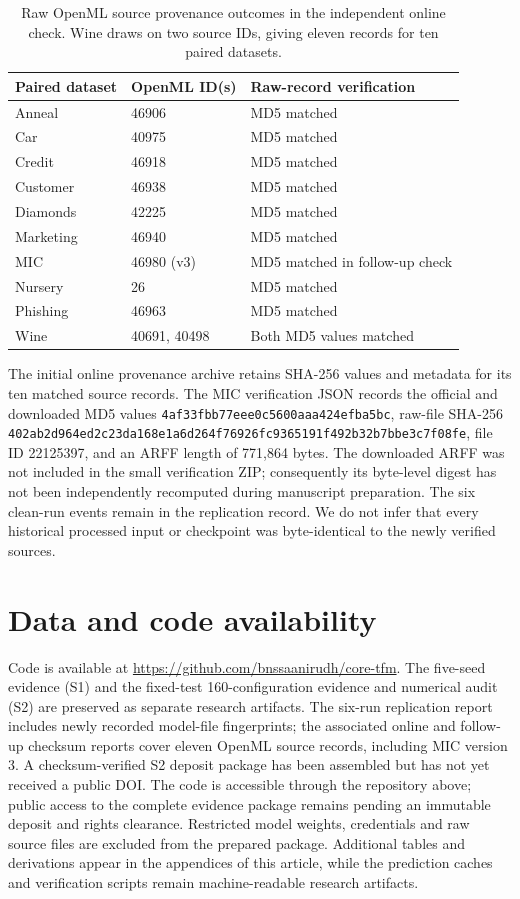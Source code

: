 \documentclass[a4paper,fleqn]{cas-sc}
\begin{document}
\begin{table}[htbp]
\centering
\caption{Raw OpenML source provenance outcomes in the independent online check. Wine draws on two source IDs, giving eleven records for ten paired datasets.}
\label{tab:openmlprovenance}
\begin{tabular}{lll}
\toprule
Paired dataset & OpenML ID(s) & Raw-record verification\\
\midrule
Anneal & 46906 & MD5 matched\\
Car & 40975 & MD5 matched\\
Credit & 46918 & MD5 matched\\
Customer & 46938 & MD5 matched\\
Diamonds & 42225 & MD5 matched\\
Marketing & 46940 & MD5 matched\\
MIC & 46980 (v3) & MD5 matched in follow-up check\\
Nursery & 26 & MD5 matched\\
Phishing & 46963 & MD5 matched\\
Wine & 40691, 40498 & Both MD5 values matched\\
\bottomrule
\end{tabular}
\end{table}
The initial online provenance archive retains SHA-256 values and metadata for its ten matched source records. The MIC verification JSON records the official and downloaded MD5 values \texttt{4af33fbb77eee0c5\allowbreak 600aaa424efba5bc}, raw-file SHA-256 \texttt{402ab2d964ed2c23\allowbreak da168e1a6d264f76\allowbreak 926fc9365191f492\allowbreak b32b7bbe3c7f08fe}, file ID 22125397, and an ARFF length of 771,864 bytes. The downloaded ARFF was not included in the small verification ZIP; consequently its byte-level digest has not been independently recomputed during manuscript preparation. The six clean-run events remain in the replication record. We do not infer that every historical processed input or checkpoint was byte-identical to the newly verified sources.

\FloatBarrier
\section*{Data and code availability}
Code is available at \url{https://github.com/bnssaanirudh/core-tfm}. The five-seed evidence (S1) and the fixed-test 160-configuration evidence and numerical audit (S2) are preserved as separate research artifacts. The six-run replication report includes newly recorded model-file fingerprints; the associated online and follow-up checksum reports cover eleven OpenML source records, including MIC version 3. A checksum-verified S2 deposit package has been assembled but has not yet received a public DOI. The code is accessible through the repository above; public access to the complete evidence package remains pending an immutable deposit and rights clearance. Restricted model weights, credentials and raw source files are excluded from the prepared package. Additional tables and derivations appear in the appendices of this article, while the prediction caches and verification scripts remain machine-readable research artifacts.
\end{document}
